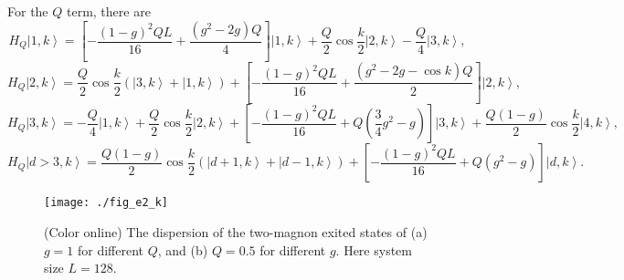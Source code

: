 \documentclass[article,10pt,onecolumn,superscriptaddress,floatfix]{revtex4}
\begin{document}
For the $Q$ term, there are
\begin{equation}
H_{Q}\left|1,k\right\rangle   =  \left[-\frac{\left(1-g\right)^{2}QL}{16}+\frac{\left(g^{2}-2g\right)Q}{4}\right]\left|1,k\right\rangle +\frac{Q}{2}\cos \frac{k}{2}\left|2,k\right\rangle -\frac{Q}{4}\left|3,k\right\rangle,
\end{equation}
\begin{equation}
H_{Q}\left|2,k\right\rangle   =  \frac{Q}{2}\cos \frac{k}{2}\left(\left|3,k\right\rangle +\left|1,k\right\rangle \right) +\left[-\frac{\left(1-g\right)^{2}QL}{16}+\frac{\left(g^{2}-2g-\cos k\right)Q}{2}\right]\left|2,k\right\rangle,
\end{equation}
\begin{equation}
H_{Q}\left|3,k\right\rangle   =  -\frac{Q}{4}\left|1,k\right\rangle +\frac{Q}{2}\cos \frac{k}{2}\left|2,k\right\rangle
+\left[-\frac{\left(1-g\right)^{2}QL}{16}+Q\left(\frac{3}{4}g^{2}-g\right)\right]\left|3,k\right\rangle  +\frac{Q\left(1-g\right)}{2}\cos \frac{k}{2}\left|4,k\right\rangle,
\end{equation}
\begin{equation}
H_{Q}\left|d>3,k\right\rangle   =  \frac{Q\left(1-g\right)}{2}\cos \frac{k}{2}\left(\left|d+1,k\right\rangle +\left|d-1,k\right\rangle \right) +\left[-\frac{\left(1-g\right)^{2}QL}{16}+Q\left(g^{2}-g\right)\right]\left|d,k\right\rangle.
\end{equation}


\begin{flushleft}
	\begin{figure}[!tb] %
		\centering
		\texttt{[image: ./fig\_e2\_k]}
		\caption{ (Color online) The dispersion of the two-magnon exited states of (a) $g=1$ for different $Q$, and (b) $Q=0.5$ for different $g$. Here system size $L=128$. }%
		\label{fig:E2k}
	\end{figure}
\end{flushleft}
\end{document}
